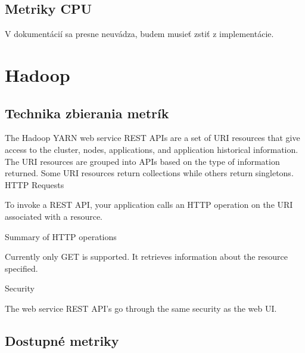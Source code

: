 \documentclass[11pt,final,oneside]{fithesis}
\begin{document}
\subsection{Metriky CPU}
V dokumentácií sa presne neuvádza, budem musieť zstiť z implementácie.


\section{Hadoop}

\subsection{Technika zbierania metrík}
The Hadoop YARN web service REST APIs are a set of URI resources that give access to the cluster, nodes, applications, and application historical information. 
The URI resources are grouped into APIs based on the type of information returned. Some URI resources return collections while others return singletons.
HTTP Requests

To invoke a REST API, your application calls an HTTP operation on the URI associated with a resource.

Summary of HTTP operations

Currently only GET is supported. It retrieves information about the resource specified.

Security

The web service REST API’s go through the same security as the web UI. 

\cite{18}

\subsection{Dostupné metriky}
\end{document}
